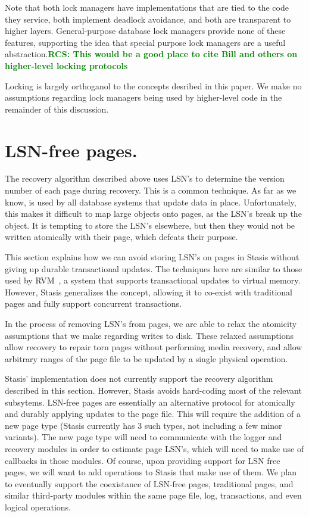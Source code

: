 \documentclass[letterpaper,twocolumn,10pt]{article}
\newcommand{\yad}{Stasis\xspace}
\newcommand{\yads}{Stasis'\xspace}
\newcommand{\rcs}[1]{\textcolor{green}{\bf RCS: #1}}
\begin{document}
Note that both lock managers have implementations that are tied to the
code they service, both implement deadlock avoidance, and both are
transparent to higher layers.  General-purpose database lock managers
provide none of these features, supporting the idea that special
purpose lock managers are a useful abstraction.\rcs{This would be a
good place to cite Bill and others on higher-level locking protocols}

Locking is largely orthoganol to the concepts desribed in this paper.
We make no assumptions regarding lock managers being used by higher-level code in the remainder of this discussion.

\section{LSN-free pages.}
\label{sec:lsn-free}
The recovery algorithm described above uses LSN's to determine the
version number of each page during recovery.  This is a common
technique.  As far as we know, is used by all database systems that
update data in place.  Unfortunately, this makes it difficult to map
large objects onto pages, as the LSN's break up the object.  It
is tempting to store the LSN's elsewhere, but then they would not be
written atomically with their page, which defeats their purpose.

This section explains how we can avoid storing LSN's on pages in \yad
without giving up durable transactional updates.  The techniques here
are similar to those used by RVM~\cite{lrvm}, a system that supports
transactional updates to virtual memory.  However, \yad generalizes
the concept, allowing it to co-exist with traditional pages and fully
support concurrent transactions.

In the process of removing LSN's from pages, we
are able to relax the atomicity assumptions that we make regarding
writes to disk.  These relaxed assumptions allow recovery to repair
torn pages without performing media recovery, and allow arbitrary
ranges of the page file to be updated by a single physical operation.

\yads implementation does not currently support the recovery algorithm
described in this section.  However, \yad avoids hard-coding most of
the relevant subsytems.  LSN-free pages are essentially an alternative
protocol for atomically and durably applying updates to the page file.
This will require the addition of a new page type (\yad currently has
3 such types, not including a few minor variants).  The new page type
will need to communicate with the logger and recovery modules in order
to estimate page LSN's, which will need to make use of callbacks in
those modules.  Of course, upon providing support for LSN free pages,
we will want to add operations to \yad that make use of them.  We plan
to eventually support the coexistance of LSN-free pages, traditional
pages, and similar third-party modules within the same page file, log,
transactions, and even logical operations.
\end{document}
